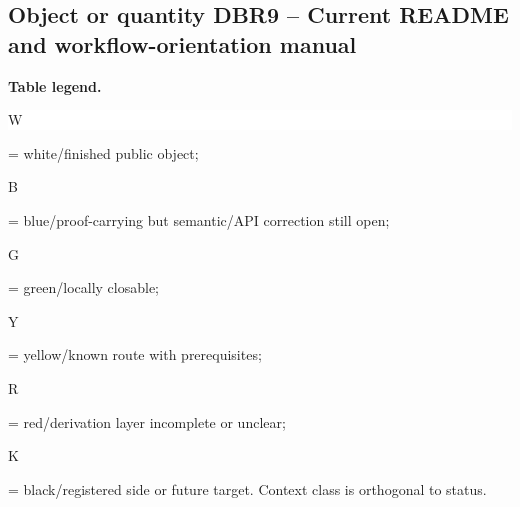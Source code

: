 \subsection*{Object or quantity DBR9 -- Current README and workflow-orientation manual}
\hypertarget{objproof:DBR9}{}
\par\smallskip\noindent\begin{minipage}{0.99\linewidth}\footnotesize\raggedright\textbf{Table legend.} \colorbox{white}{\strut W} = white/finished public object; \colorbox{cyan!20}{\strut B} = blue/proof-carrying but semantic/API correction still open; \colorbox{green!18}{\strut G} = green/locally closable; \colorbox{yellow!25}{\strut Y} = yellow/known route with prerequisites; \colorbox{red!20}{\strut R} = red/derivation layer incomplete or unclear; \colorbox{black!18}{\strut K} = black/registered side or future target. Context class is orthogonal to status.\end{minipage}\par\vspace{0.25em}
